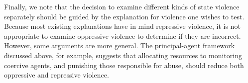 \documentclass[11pt]{article}
\begin{document}
Finally, we note that the decision to examine different kinds of state violence separately should be guided by the explanation for violence one wishes to test. Because most existing explanations have in mind repressive violence, it is not appropriate to examine oppressive violence to determine if they are incorrect. However, some arguments are more general. The principal-agent framework discussed above, for example, suggests that allocating resources to monitoring coercive agents, and punishing those responsible for abuse, should reduce both oppressive and repressive violence.   


\clearpage
\begin{singlespace}


\end{singlespace}
\end{document}
